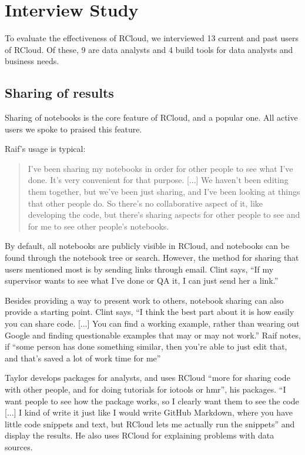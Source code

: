 \section{Interview Study\label{sec:interviews}}

To evaluate the effectiveness of RCloud, we interviewed 13 current and past
users of RCloud. Of these, 9 are data analysts and 4 build tools for data
analysts and business needs.


\subsection{Sharing of results}
Sharing of notebooks is the core feature of RCloud, and a popular one. All
active users we spoke to praised this feature.

Raif's usage is typical:
\begin{quote}
I've been sharing my notebooks in order for other people to see what
I've done. It's very convenient for that purpose. [...] We haven't
been editing them together, but we've been just sharing, and I've been looking
at things that other people do. So there's no collaborative aspect of it, like
developing the code, but there's sharing aspects for other people to see and for
me to see other people's notebooks.
\end{quote}

By default, all notebooks are publicly visible in RCloud, and notebooks can be
found through the notebook tree or search. However, the method for sharing that
users mentioned most is by sending links through email. Clint says, ``If my supervisor
wants to see what I've done or QA it, I can just send her a link.''

Besides providing a way to present work to others, notebook sharing can also
provide a starting point. Clint says, ``I think the best part about it is how
easily you can share code. [...] You can find a working example, rather than wearing
out Google and finding questionable examples that may or may not work.'' Raif
notes, if ``some person has done something similar, then you're able to just
edit that, and that's saved a lot of work time for me''

Taylor develops packages for analysts, and uses RCloud ``more for sharing code with
other people, and for doing tutorials for iotools or hmr'', his packages.
``I want people to see how the package works, so I clearly want them
to see the code [...] I kind of write it just like I would write GitHub
Markdown, where you have little code snippets and text, but RCloud lets me
actually run the snippets'' and display the results. He also uses RCloud for
explaining problems with data sources.

